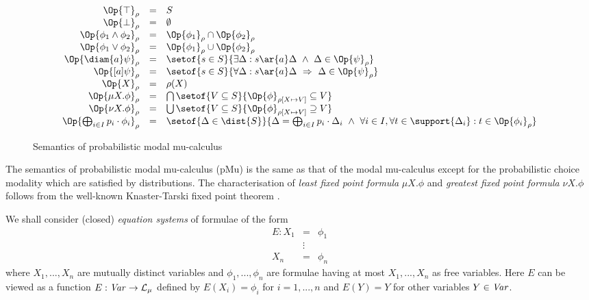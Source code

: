 \documentclass{article}
\def \CL{{\cal L}}
\def \Var{{\it Var}}
\newcommand{\boxm}[1]{[#1]}
\begin{document}
\begin{figure}
\[\begin{array}{rcl}
\Op{\top}_\rho & = & S \\
\Op{\bot}_\rho & = & \emptyset \\
\Op{\phi_1\wedge\phi_2}_\rho & = & \Op{\phi_1}_\rho\cap \Op{\phi_2}_\rho \\
\Op{\phi_1\vee\phi_2}_\rho & = & \Op{\phi_1}_\rho\cup \Op{\phi_2}_\rho\\
\Op{\diam{a}\psi}_\rho & = & \setof{s\in S}{\exists
  \Delta:s \ar{a} \Delta\ \wedge\ \Delta\in\Op{\psi}_\rho}\\
\Op{\boxm{a}\psi}_\rho & = & \setof{s\in S}{\forall
  \Delta:s \ar{a} \Delta\ \Rightarrow\
  \Delta\in\Op{\psi}_\rho}\\
\Op{X}_\rho & = & \rho(X) \\
\Op{\mu X.\phi}_\rho & = & \bigcap\setof{V\subseteq
S}{\Op{\phi}_{\rho[X\mapsto V]} \subseteq
  V}\\
\Op{\nu X.\phi}_\rho & = & \bigcup\setof{V\subseteq
S}{\Op{\phi}_{\rho[X\mapsto V]} \supseteq
  V}\\
  \Op{\bigoplus_{i\in I}p_i\cdot\phi_i}_\rho & = &  \setof{\Delta\in
\dist{S}}{\Delta= \bigoplus_{i\in I}p_i\cdot\Delta_i
  \ \wedge\ \forall i\in I,\forall t\in\support{\Delta_i}: t\in\Op{\phi_i}_\rho}
\end{array}\]
\caption{Semantics of probabilistic modal
mu-calculus}\label{f:semantics}
\end{figure}

The semantics of probabilistic modal mu-calculus (pMu) is the same
as that of the modal mu-calculus \cite{Koz83} except for the
probabilistic choice modality which are satisfied by distributions.
The characterisation of {\em least fixed point
  formula} $\mu X.\phi$ and {\em greatest fixed point formula} $\nu
X.\phi$ follows from the well-known Knaster-Tarski fixed point
theorem \cite{Tar55}.

We shall consider (closed) {\em equation systems} of formulae of the
form
\[\begin{array}{rcl}
E: X_1 & = & \phi_1 \\
       & \vdots & \\
   X_n & = & \phi_n
\end{array}\]
where $X_1,...,X_n$ are mutually distinct variables and
$\phi_1,...,\phi_n$ are formulae having at most $X_1,...,X_n$ as
free variables. Here $E$ can be viewed as a function
$E:\Var\rightarrow\CL_\mu$ defined by $E(X_i)=\phi_i$ for
$i=1,...,n$ and $E(Y)=Y$ for other variables $Y\in\Var$.
\end{document}
